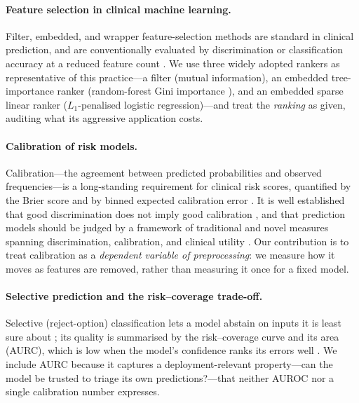 \documentclass[fleqn,10pt]{wlscirep}
\begin{document}
\paragraph{Feature selection in clinical machine learning.}
Filter, embedded, and wrapper feature-selection methods are standard in clinical prediction,
and are conventionally evaluated by discrimination or classification accuracy at a reduced
feature count \cite{guyon2003introduction,saeys2007review}. We use three widely adopted
rankers as representative of this practice---a filter (mutual information), an embedded
tree-importance ranker (random-forest Gini importance \cite{breiman2001random}), and an
embedded sparse linear ranker ($L_1$-penalised logistic regression)---and treat the
\emph{ranking} as given, auditing what its aggressive application costs.

\paragraph{Calibration of risk models.}
Calibration---the agreement between predicted probabilities and observed frequencies---is a
long-standing requirement for clinical risk scores, quantified by the Brier score \cite{brier1950verification}
and by binned expected calibration error \cite{niculescu2005predicting,guo2017calibration}.
It is well established that good discrimination does not imply good
calibration \cite{vancalster2019calibration}, and that prediction models should be judged by a
framework of traditional and novel measures spanning discrimination, calibration, and clinical utility
\cite{steyerberg2010assessing}. Our contribution is to treat calibration as a
\emph{dependent variable of preprocessing}: we measure how it moves as features are removed,
rather than measuring it once for a fixed model.

\paragraph{Selective prediction and the risk--coverage trade-off.}
Selective (reject-option) classification lets a model abstain on inputs it is least sure
about \cite{elyaniv2010foundations}; its quality is summarised by the risk--coverage curve and
its area (AURC), which is low when the model's confidence ranks its errors well
\cite{geifman2017selective}. We include AURC because it captures a
deployment-relevant property---can the model be trusted to triage its own predictions?---that
neither AUROC nor a single calibration number expresses.
\end{document}
